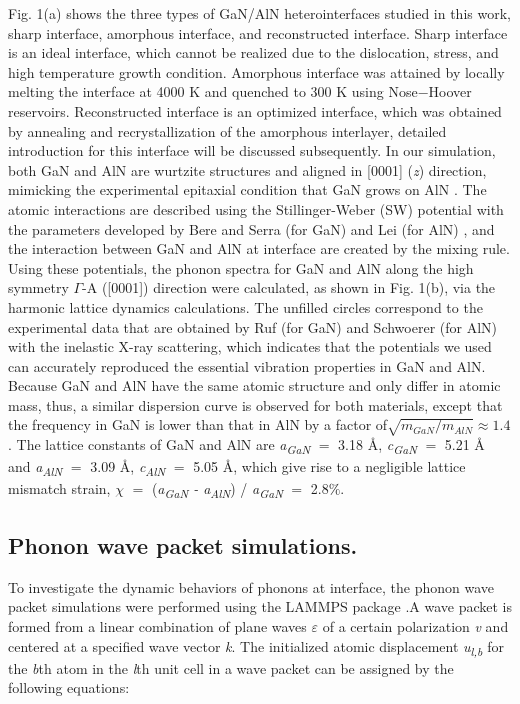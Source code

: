 \documentclass{article}
\begin{document}
Fig. 1(a) shows the three types of GaN/AlN heterointerfaces studied in this work, sharp interface, amorphous interface, and reconstructed interface. Sharp interface is an ideal interface, which cannot be realized due to the dislocation, stress, and high temperature growth condition. Amorphous interface was attained by locally melting the interface at 4000 K and quenched to 300 K using Nose$-$Hoover reservoirs. Reconstructed interface is an optimized interface, which was obtained by annealing and recrystallization of the amorphous interlayer, detailed introduction for this interface will be discussed subsequently. In our simulation, both GaN and AlN are wurtzite structures and aligned in [0001] (\textit{z}) direction, mimicking the experimental epitaxial condition that GaN grows on AlN \cite{stanchu2018strain}. The atomic interactions are described using the Stillinger-Weber (SW) potential with the parameters developed by Bere and Serra (for GaN) \cite{bere2002atomic} and Lei (for AlN) \cite{lei2009molecular}, and the interaction between GaN and AlN at interface are created by the mixing rule. Using these potentials, the phonon spectra for GaN and AlN along the high symmetry $\Gamma$-A ([0001]) direction were calculated, as shown in Fig. 1(b), via the harmonic lattice dynamics calculations. The unfilled circles correspond to the experimental data that are obtained by Ruf (for GaN) \cite{ruf2001phonon} and Schwoerer (for AlN) \cite{schwoerer1999phonons} with the inelastic X-ray scattering, which indicates that the potentials we used can accurately reproduced the essential vibration properties in GaN and AlN. Because GaN and AlN have the same atomic structure and only differ in atomic mass, thus, a similar dispersion curve is observed for both materials, except that the frequency in GaN is lower than that in AlN by a factor of\(\sqrt{m_{GaN}/m_{AlN}}\approx 1.4\). The lattice constants of GaN and AlN are \textit{a\textsubscript{GaN}} $=$ 3.18 Å, \textit{c\textsubscript{GaN}} $=$ 5.21 Å and \textit{a\textsubscript{AlN}} $=$ 3.09 Å, \textit{c\textsubscript{AlN}} $=$ 5.05 Å, which give rise to a negligible lattice mismatch strain, \textit{$\chi$} $=$ (\textit{a\textsubscript{GaN} - a\textsubscript{AlN}}) / \textit{a\textsubscript{GaN}} $=$ 2.8$\%$. 

\subsection{Phonon wave packet simulations.}

To investigate the dynamic behaviors of phonons at interface, the phonon wave packet simulations were performed using the LAMMPS package  \cite{plimpton1995fast}.A wave packet is formed from a linear combination of  plane waves \textit{$\varepsilon$} of a certain polarization \textit{v} and centered at a specified wave vector \textit{k}. The initialized atomic displacement \textit{u\textsubscript{l}\textsubscript{,b}} for the \textit{b}th atom in the \textit{l}th unit cell in a wave packet can be assigned by the following equations:
\end{document}
